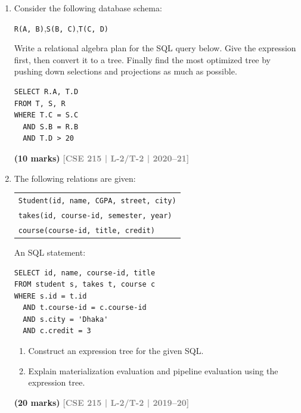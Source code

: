 \documentclass[12pt]{article}
\newcommand{\yr}[1]{\hfill\textcolor{gray}{\small\textbf{[#1]}}}
\newcommand{\mk}[1]{\textcolor{orange!70!black}{\small\textbf{(#1 marks)}}}
\begin{document}
\begin{enumerate}
\vspace{0.2cm}
 
\vspace{0.2cm}

\textbf{Equivalence Rules (The notations carry usual meaning)}
\begin{enumerate}
    \item $\sigma_{\theta}(E_1 \times E_2) = E_1 \bowtie_{\theta} E_2$
    \item $\sigma_{\theta_0}(E_1 \bowtie_{\theta} E_2) \equiv (\sigma_{\theta_0}(E_1)) \bowtie_{\theta} E_2$
    \item $\sigma_{\theta_1 \wedge \theta_2}(E_1 \bowtie_{\theta} E_2) = (\sigma_{\theta_1}(E_1)) \bowtie_{\theta} (\sigma_{\theta_2}(E_2))$
    \item $\Pi_{L_1 \cup L_2}(E_1 \bowtie_{\theta} E_2) = \Pi_{L_1}(E_1) \bowtie_{\theta} \Pi_{L_2}(E_2)$
    \item $\Pi_{L_1 \cup L_2}(E_1 \bowtie_{\theta} E_2) = \Pi_{L_1 \cup L_2}(\Pi_{L_1 \cup L_3}(E_1) \bowtie_{\theta} \Pi_{L_2 \cup L_4}(E_2))$
\end{enumerate}
\vspace{0.1cm}

\mk{15} \yr{CSE 215 | L-2/T-2 | 2021--22}


\item Consider the following database schema:
\begin{center}
\texttt{R(A, B)},\quad \texttt{S(B, C)},\quad \texttt{T(C, D)}
\end{center}
Write a relational algebra plan for the SQL query below. Give the expression first, then convert it to a tree. Finally find the most optimized tree by pushing down selections and projections as much as possible.
\begin{lstlisting}
SELECT R.A, T.D
FROM T, S, R
WHERE T.C = S.C
  AND S.B = R.B
  AND T.D > 20
\end{lstlisting}
 \mk{10} \yr{CSE 215 | L-2/T-2 | 2020--21}

\item The following relations are given:
\begin{center}
\begin{tabular}{l}
\texttt{Student(id, name, CGPA, street, city)}\\
\texttt{takes(id, course-id, semester, year)}\\
\texttt{course(course-id, title, credit)}
\end{tabular}
\end{center}
An SQL statement:
\begin{lstlisting}
SELECT id, name, course-id, title
FROM student s, takes t, course c
WHERE s.id = t.id
  AND t.course-id = c.course-id
  AND s.city = 'Dhaka'
  AND c.credit = 3
\end{lstlisting}
\begin{enumerate}
  \item Construct an expression tree for the given SQL.
  \item Explain materialization evaluation and pipeline evaluation using the expression tree.
\end{enumerate}
\mk{20} \yr{CSE 215 | L-2/T-2 | 2019--20}



\end{enumerate}
\end{document}
